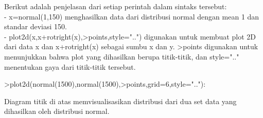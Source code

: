 \documentclass[a4paper,10pt]{article}
\begin{document}
\begin{eulernotebook}
\begin{eulercomment}
\begin{eulercomment}
\begin{eulercomment}
\begin{eulercomment}
\begin{eulercomment}
\begin{eulercomment}
\begin{eulercomment}
\begin{eulercomment}
\begin{eulercomment}
\begin{eulercomment}
\begin{eulercomment}
\begin{eulercomment}
\begin{eulercomment}
\begin{eulercomment}
\begin{eulercomment}
\begin{eulercomment}
\begin{eulercomment}
Berikut adalah penjelasan dari setiap perintah dalam sintaks tersebut:\\
- x=normal(1,150) menghasilkan data dari distribusi normal dengan mean
1 dan standar deviasi 150.\\
- plot2d(x,x+rotright(x),\textgreater{}points,style="..") digunakan untuk membuat
plot 2D dari data x dan x+rotright(x) sebagai sumbu x dan y. \textgreater{}points
digunakan untuk menunjukkan bahwa plot yang dihasilkan berupa
titik-titik, dan style=".." menentukan gaya dari titik-titik tersebut.
\end{eulercomment}
\begin{eulerprompt}
>plot2d(normal(1500),normal(1500),>points,grid=6,style=".."):
\end{eulerprompt}
\begin{eulercomment}
Diagram titik di atas memvisualisasikan distribusi dari dua set data
yang dihasilkan oleh distribusi normal.


\end{eulercomment}
\end{eulercomment}
\end{eulercomment}
\end{eulercomment}
\end{eulercomment}
\end{eulercomment}
\end{eulercomment}
\end{eulercomment}
\end{eulercomment}
\end{eulercomment}
\end{eulercomment}
\end{eulercomment}
\end{eulercomment}
\end{eulercomment}
\end{eulercomment}
\end{eulercomment}
\end{eulercomment}
\end{eulernotebook}
\end{document}
